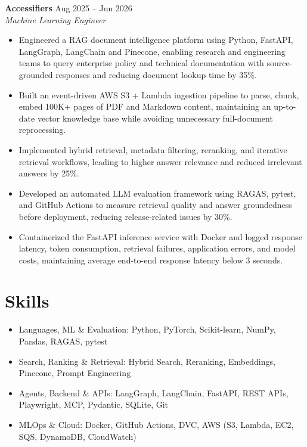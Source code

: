 \documentclass[10pt, letterpaper]{article}
\begin{document}
\textbf{Accessifiers} \hfill Aug 2025 -- Jun 2026 \\
\textit{Machine Learning Engineer}
\begin{itemize}
    \item Engineered a RAG document intelligence platform using Python, FastAPI, LangGraph, LangChain and Pinecone, enabling research and engineering teams to query enterprise policy and technical documentation with source-grounded responses and reducing document lookup time by 35\%.
    \item Built an event-driven AWS S3 + Lambda ingestion pipeline to parse, chunk, embed 100K+ pages of PDF and Markdown content, maintaining an up-to-date vector knowledge base while avoiding unnecessary full-document reprocessing.
    \item Implemented hybrid retrieval, metadata filtering, reranking, and iterative retrieval workflows, leading to higher answer relevance and reduced irrelevant answers by 25\%.
    \item Developed an automated LLM evaluation framework using RAGAS, pytest, and GitHub Actions to measure retrieval quality and answer groundedness before deployment, reducing release-related issues by 30\%.
    \item Containerized the FastAPI inference service with Docker and logged response latency, token consumption, retrieval failures, application errors, and model costs, maintaining average end-to-end response latency below 3 seconds.
\end{itemize}

\section{Skills}
\begin{itemize}
    \item Languages, ML \& Evaluation: Python, PyTorch, Scikit-learn, NumPy, Pandas, RAGAS, pytest
    \item Search, Ranking \& Retrieval: Hybrid Search, Reranking, Embeddings, Pinecone, Prompt Engineering
    \item Agents, Backend \& APIs: LangGraph, LangChain, FastAPI, REST APIs, Playwright, MCP, Pydantic, SQLite, Git
    \item MLOps \& Cloud: Docker, GitHub Actions, DVC, AWS (S3, Lambda, EC2, SQS, DynamoDB, CloudWatch)
\end{itemize}
\end{document}
